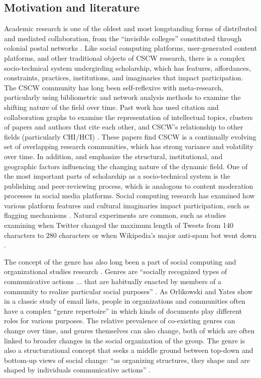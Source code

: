 \documentclass[format=acmsmall, screen=true]{acmart}
\begin{document}
\subsection{Motivation and literature}
Academic research is one of the oldest and most longstanding forms of distributed and mediated collaboration, from the ``invisible colleges'' constituted through colonial postal networks \cite{shapin_leviathan_1985}. Like social computing platforms, user-generated content platforms, and other traditional objects of CSCW research, there is a complex socio-technical system undergirding scholarship, which has features, affordances, constraints, practices, institutions, and imaginaries that impact participation. The CSCW community has long been self-reflexive with meta-research, particularly using bibliometric and network analysis methods to examine the shifting nature of the field over time. Past work has used citation and collaboration graphs to examine the representation of intellectual topics, clusters of papers and authors that cite each other, and CSCW's relationship to other fields (particularly CHI/HCI) \cite{Wallace2017, Correia2018, Jacovi2006, Horn2004, Keegan2013}. These papers find CSCW is a continually evolving set of overlapping research communities, which has strong variance and volatility over time. In addition, \cite{Keegan2013} and \cite{correia2019effect} emphasize the structural, institutional, and geographic factors influencing the changing nature of the dynamic field. 
One of the most important parts of scholarship as a socio-technical system is the publishing and peer-reviewing process, which is analogous to content moderation processes in social media platforms. Social computing research has examined how various platform features and cultural imaginaries impact participation, such as flagging mechanisms \cite{crawford2016flag}. Natural experiments are common, such as studies examining when Twitter changed the maximum length of Tweets from 140 characters to 280 characters \cite{gligoric2018constraints,rimjhim2018characterizing} or when Wikipedia's major anti-spam bot went down \cite{geiger2013levee}. 

The concept of the genre has also long been a part of social computing and organizational studies research \cite{orlikowski_genre_1994, morgan2010negotiating, herring2004bridging, spinuzzi2000genre}. Genres are ``socially recognized types of communicative actions ... that are habitually enacted by members of a community to realize particular social purposes'' \cite[p. 542]{orlikowski_genre_1994}. As Orlikowski and Yates show in a classic study of email lists, people in organizations and communities often have a complex ``genre repertoire'' \cite[p. 546]{orlikowski_genre_1994} in which kinds of documents play different roles for various purposes. The relative prevalence of co-existing genres can change over time, and genres themselves can also change, both of which are often linked to broader changes in the social organization of the group. The genre is also a structurational \cite{anthony1984constitution} concept that seeks a middle ground between top-down and bottom-up views of social change: ``as organizing structures, they shape and are shaped by individuals communicative actions'' \cite[p. 541]{orlikowski_genre_1994}. 
\end{document}

